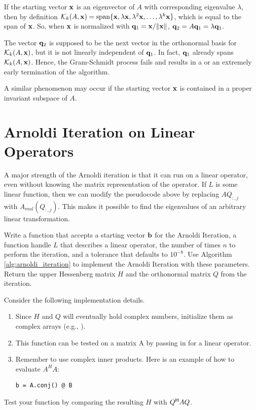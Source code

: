 \begin{warn}
If the starting vector $\mathbf{x}$ is an eigenvector of $A$ with corresponding eigenvalue $\lambda$, then by definition $\mathcal{K}_k(A, \mathbf{x})=\text{span}\{\mathbf{x}, \lambda \mathbf{x}, \lambda^2\mathbf{x}, \ldots, \lambda^k \mathbf{x}\}$, which is equal to the span of $\mathbf{x}$.
So, when $\mathbf{x}$ is normalized with $\mathbf{q}_1 = \mathbf{x}/\|\mathbf{x}\|$, $\mathbf{q}_2 = A\mathbf{q}_1 = \lambda \mathbf{q}_1$.

The vector $\mathbf{q}_2$ is supposed to be the next vector in the orthonormal basis for $\mathcal{K}_k(A, \mathbf{x})$, but it is not linearly independent of $\mathbf{q}_1$.
In fact, $\mathbf{q}_1$ already spans $\mathcal{K}_k(A, \mathbf{x})$.
Hence, the Gram-Schmidt process fails and results in a  or an extremely early termination of the algorithm.

A similar phenomenon may occur if the starting vector $\mathbf{x}$ is contained in a proper invariant subspace of $A$.
\end{warn}

\section*{Arnoldi Iteration on Linear Operators} %

A major strength of the Arnoldi iteration is that it can run on a linear operator, even without knowing the matrix representation of the operator.
If $L$ is some linear function, then we can modify the pseudocode above by replacing $AQ_{:,j}$ with $A_{mul}(Q_{:,j})$.
This makes it possible to find the eigenvalues of an arbitrary linear transformation.

\begin{problem}\label{prob:arnoldi}
Write a function that accepts a starting vector $\mathbf{b}$ for the Arnoldi Iteration, a function handle $L$ that describes a linear operator, the number of times $n$ to perform the iteration, and a tolerance  that defaults to $10^{-8}$.
Use Algorithm \ref{alg:arnoldi_iteration} to implement the Arnoldi Iteration with these parameters.
Return the upper Hessenberg matrix $H$ and the orthonormal matrix $Q$ from the iteration.

Consider the following implementation details.
\begin{enumerate}
\item Since $H$ and $Q$ will eventually hold complex numbers, initialize them as complex arrays (e.g., ).
\item This function can be tested on a matrix A by passing in  for a linear operator.
\item Remember to use complex inner products. Here is an example of how to evaluate $A^HA$:
\begin{lstlisting}
b = A.conj() @ B
\end{lstlisting}
\end{enumerate}
Test your function by comparing the resulting $H$ with $Q^{\mathsf H} A Q$.
\end{problem}

